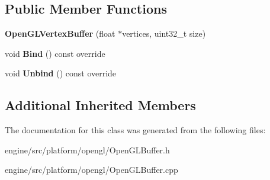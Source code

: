 \subsection*{Public Member Functions}
\begin{DoxyCompactItemize}
\item
\mbox{\label{classengine_1_1platform_1_1opengl_1_1OpenGLVertexBuffer_a481164805afb44795f3e545e07c3b3bc}}
{\bfseries Open\+G\+L\+Vertex\+Buffer} (float $\ast$vertices, uint32\+\_\+t size)
\item
\mbox{\label{classengine_1_1platform_1_1opengl_1_1OpenGLVertexBuffer_ac50918719a747f81d7fe94dfcc8dec13}}
void {\bfseries Bind} () const override
\item
\mbox{\label{classengine_1_1platform_1_1opengl_1_1OpenGLVertexBuffer_a9069ca746c0de9dd9418ba9c5ee7b67b}}
void {\bfseries Unbind} () const override
\end{DoxyCompactItemize}
\subsection*{Additional Inherited Members}


The documentation for this class was generated from the following files\+:\begin{DoxyCompactItemize}
\item
engine/src/platform/opengl/Open\+G\+L\+Buffer.\+h\item
engine/src/platform/opengl/Open\+G\+L\+Buffer.\+cpp\end{DoxyCompactItemize}
